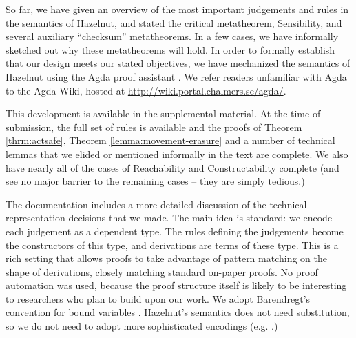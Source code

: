 So far, we have given an overview of the most important judgements and rules in
the semantics of Hazelnut, and stated the critical metatheorem, Sensibility, and several auxiliary ``checksum'' metatheorems. In a few
cases, we have informally sketched out why these metatheorems will hold. In order to formally establish that our design meets our stated objectives, we
have mechanized the semantics of Hazelnut using the Agda proof assistant \cite{norell:thesis}. We 
refer readers unfamiliar with Agda to the Agda Wiki, hosted
at \url{http://wiki.portal.chalmers.se/agda/}.

This development is available in the supplemental material. At the time of submission, the full set of rules is available and the proofs of Theorem \ref{thrm:actsafe}, Theorem \ref{lemma:movement-erasure} and a number of technical lemmas that we elided or mentioned informally in the text are complete. We also have nearly all of the cases of Reachability and Constructability complete (and see no major barrier to the remaining cases -- they are simply tedious.) 

The documentation 
includes a more detailed discussion of the technical representation
decisions that we made. The main idea is standard: we encode each judgement as a
dependent type. The rules defining the judgements become the constructors of this
type, and derivations are terms of these type. This is a rich
setting that allows proofs to take advantage of pattern matching on the
shape of derivations, closely matching standard on-paper proofs. No proof automation was used, because the proof structure itself is likely to be interesting to researchers who plan to build upon our work. 
We adopt Barendregt's convention for
bound variables \cite{urban}. Hazelnut's semantics does not need substitution, so we do not need to adopt more sophisticated encodings (e.g. \cite{lh09unibind,Pouillard11}.)
